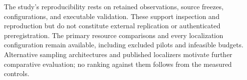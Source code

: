 The study's reproducibility rests on retained observations, source freezes, configurations, and executable validation. These support inspection and reproduction but do not constitute external replication or authenticated preregistration. The primary resource comparisons and every localization configuration remain available, including excluded pilots and infeasible budgets. Alternative sampling architectures and published localizers motivate further comparative evaluation; no ranking against them follows from the measured controls.
